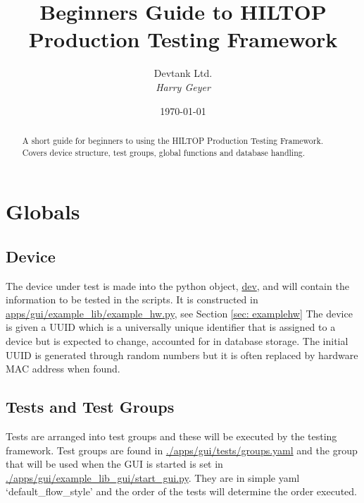 \documentclass[a4paper,12pt, notitlepage]{article}
\begin{document}
\title{\textbf{\large{Beginners Guide to HILTOP Production Testing Framework}}}

\author{\normalsize{Devtank Ltd.} \\
        \small\textit{
        Harry Geyer}}
\date{\today}

\maketitle 
\thispagestyle{fancy}

\begin{abstract} 
\noindent
A short guide for beginners to using the HILTOP Production Testing Framework. Covers device structure, test groups, global functions and database handling. 
\end{abstract}


\newpage

\section{Globals}
\label{sec: globals}

\subsection{Device}
\label{ssec: globalsDev}

The device under test is made into the python object, \url{dev}, and will contain the information to be tested in the scripts. It is constructed in \url{apps/gui/example_lib/example_hw.py}, see Section \ref{sec: examplehw} The device is given a UUID which is a universally unique identifier that is assigned to a device but is expected to change, accounted for in database storage. The initial UUID is generated through random numbers but it is often replaced by hardware MAC address when found.

\subsection{Tests and Test Groups}
\label{globalTests}

Tests are arranged into test groups and these will be executed by the testing framework. Test groups are found in \url{./apps/gui/tests/groups.yaml} and the group that will be used when the GUI is started is set in \url{./apps/gui/example_lib_gui/start_gui.py}. They are in simple yaml `default\_flow\_style' and the order of the tests will determine the order executed.
\end{document}
